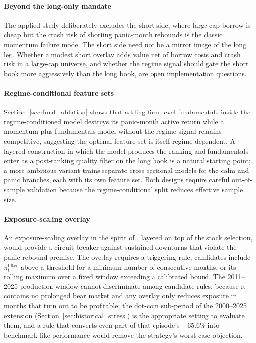 \bigskip\paragraph{Beyond the long-only mandate}
The applied study deliberately excludes the short side, where large-cap borrow is cheap but the crash risk of shorting panic-month rebounds is the classic momentum failure mode. The short side need not be a mirror image of the long leg. Whether a modest short overlay adds value net of borrow costs and crash risk in a large-cap universe, and whether the regime signal should gate the short book more aggressively than the long book, are open implementation questions.

\bigskip\paragraph{Regime-conditional feature sets}
Section~\ref{sec:fund_ablation} shows that adding firm-level fundamentals inside the regime-conditioned model destroys its panic-month active return while a momentum-plus-fundamentals model without the regime signal remains competitive, suggesting the optimal feature set is itself regime-dependent. A layered construction in which the model produces the ranking and fundamentals enter as a post-ranking quality filter on the long book is a natural starting point; a more ambitious variant trains separate cross-sectional models for the calm and panic branches, each with its own feature set. Both designs require careful out-of-sample validation because the regime-conditional split reduces effective sample size.

\bigskip\paragraph{Exposure-scaling overlay}
An exposure-scaling overlay in the spirit of \citet{DanielMoskowitz2016}, layered on top of the stock selection, would provide a circuit breaker against sustained downturns that violate the panic-rebound premise. The overlay requires a triggering rule; candidates include $\pi_t^{\text{filter}}$ above a threshold for a minimum number of consecutive months, or its rolling maximum over a fixed window exceeding a calibrated bound. The 2011--2025 production window cannot discriminate among candidate rules, because it contains no prolonged bear market and any overlay only reduces exposure in months that turn out to be profitable; the dot-com sub-period of the 2000--2025 extension (Section~\ref{sec:historical_stress}) is the appropriate setting to evaluate them, and a rule that converts even part of that episode's $-65.6\%$ into benchmark-like performance would remove the strategy's worst-case objection.
